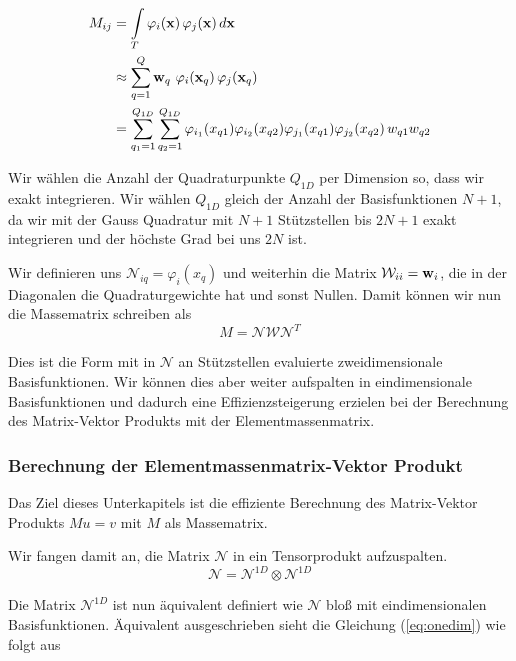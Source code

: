 \begin{equation} \label{eq:massapprox}
\begin{aligned}
M_{ij} &= \int\limits_{T} \varphi_i (\bold{x}) \, \varphi_j (\bold{x}) \, d\bold{x} \\
&\approx  \sum\limits_{q=1}^Q \bold{w}_q \, \, \varphi_i (\bold{x}_q) \, \varphi_j (\bold{x}_q) \\
&= \sum\limits_{q_1=1}^{Q_{1D}} \sum\limits_{q_2=1}^{Q_{1D}} \varphi_{i_1}(x_{q1}) \varphi_{i_2}(x_{q2}) \varphi_{j_1}(x_{q1}) \varphi_{j_2}(x_{q2}) \, w_{q1} w_{q2}
\end{aligned}
\end{equation}

Wir wählen die Anzahl der Quadraturpunkte $Q_{1D}$ per Dimension so, dass wir exakt integrieren. Wir wählen $Q_{1D}$ gleich der Anzahl der Basisfunktionen $N+1$, da wir mit der Gauss Quadratur mit $N+1$ Stützstellen bis $2N+1$ exakt integrieren und der höchste Grad bei uns $2N$ ist.

Wir definieren uns $\mathcal{N}_{iq}=\varphi_i(x_q)$ und weiterhin die Matrix $\mathcal{W}_{ii}=\bold{w}_i$, die in der Diagonalen die Quadraturgewichte hat und sonst Nullen. Damit können wir nun die Massematrix schreiben als
\begin{equation}
M = \mathcal{N} \mathcal{W} \mathcal{N}^T
\end{equation}

Dies ist die Form mit in $\mathcal{N}$ an Stützstellen evaluierte zweidimensionale Basisfunktionen. Wir können dies aber weiter aufspalten in eindimensionale Basisfunktionen und dadurch eine Effizienzsteigerung erzielen bei der Berechnung des Matrix-Vektor Produkts mit der Elementmassenmatrix.
\subsubsection{Berechnung der Elementmassenmatrix-Vektor Produkt}

Das Ziel dieses Unterkapitels ist die effiziente Berechnung des Matrix-Vektor Produkts $Mu=v$ mit $M$ als Massematrix.

Wir fangen damit an, die Matrix $\mathcal{N}$ in ein Tensorprodukt aufzuspalten. 
\begin{equation} \label{eq:onedim}
\mathcal{N} = \mathcal{N}^{1D} \otimes \mathcal{N}^{1D}
\end{equation}

Die Matrix $\mathcal{N}^{1D}$ ist nun äquivalent definiert wie $\mathcal{N}$ bloß mit eindimensionalen Basisfunktionen. Äquivalent ausgeschrieben sieht die Gleichung (\ref{eq:onedim}) wie folgt aus

